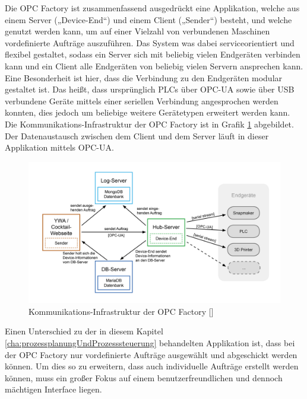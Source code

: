 Die OPC Factory ist zusammenfassend ausgedrückt eine Applikation, welche aus einem Server („Device-End“) und einem Client („Sender“) besteht, und welche genutzt werden kann, um auf einer Vielzahl von verbundenen Maschinen vordefinierte Aufträge auszuführen. Das System was dabei serviceorientiert und flexibel gestaltet, sodass ein Server sich mit beliebig vielen Endgeräten verbinden kann und ein Client alle Endgeräten von beliebig vielen Servern ansprechen kann. Eine Besonderheit ist hier, dass die Verbindung zu den Endgeräten modular gestaltet ist. Das heißt, dass ursprünglich PLCs über OPC-UA sowie über USB verbundene Geräte mittels einer seriellen Verbindung angesprochen werden konnten, dies jedoch um beliebige weitere Gerätetypen erweitert werden kann. Die Kommunikations-Infrastruktur der OPC Factory ist in Grafik \ref{fig:OPCFactoryInfrastruktur} abgebildet. Der Datenaustausch zwischen dem Client und dem Server läuft in dieser Applikation mittels OPC-UA.
%
\begin{figure}[htbp]
	\centering\includegraphics[width=1.0\textwidth]{images/04/BP_Project_Overview.png}
    \caption{Kommunikations-Infrastruktur der OPC Factory [\cite{bp}]}
    \label{fig:OPCFactoryInfrastruktur}
\end{figure}

Einen Unterschied zu der in diesem Kapitel \ref{cha:prozessplanungUndProzesssteuerung} behandelten Applikation ist, dass bei der OPC Factory nur vordefinierte Aufträge ausgewählt und abgeschickt werden können. Um dies so zu erweitern, dass auch individuelle Aufträge erstellt werden können, muss ein großer Fokus auf einem benutzerfreundlichen und dennoch mächtigen Interface liegen.
